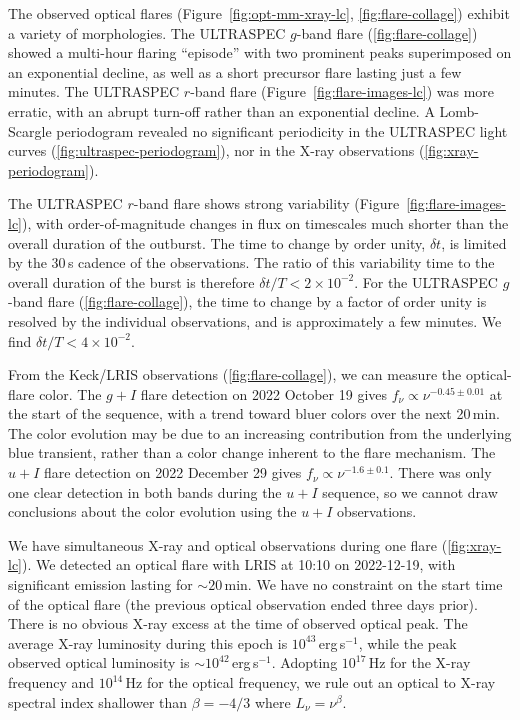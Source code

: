 \documentclass{nature_plusfigure}
\begin{document}
\begin{methods}
The observed optical flares (Figure~\ref{fig:opt-mm-xray-lc}, \ref{fig:flare-collage}) exhibit a variety of morphologies. The ULTRASPEC $g$-band flare (\ref{fig:flare-collage}) showed a multi-hour flaring ``episode'' with two prominent peaks superimposed on an exponential decline, as well as a short precursor flare lasting just a few minutes. The ULTRASPEC $r$-band flare (Figure~\ref{fig:flare-images-lc}) was more erratic, with an abrupt turn-off rather than an exponential decline. A Lomb-Scargle periodogram\cite{Lomb1976,Scargle1982} revealed no significant periodicity in the ULTRASPEC light curves (\ref{fig:ultraspec-periodogram}), nor in the X-ray observations (\ref{fig:xray-periodogram}). %

The ULTRASPEC $r$-band flare shows strong variability (Figure~\ref{fig:flare-images-lc}), with order-of-magnitude changes in flux on timescales much shorter than the overall duration of the outburst. The time to change by order unity, $\delta t$, is limited by the 30\,s cadence of the observations. The ratio of this variability time to the overall duration of the burst is therefore $\delta t/T<2\times10^{-2}$. For the ULTRASPEC $g$-band flare (\ref{fig:flare-collage}), the time to change by a factor of order unity is resolved by the individual observations, and is approximately a few minutes. We find $\delta t/T<4\times10^{-2}$.

From the Keck/LRIS observations (\ref{fig:flare-collage}), we can measure the optical-flare color. The $g+I$ flare detection on 2022 October 19 gives $f_\nu \propto \nu^{-0.45\pm0.01}$ at the start of the sequence, with a trend toward bluer colors over the next 20\,min. The color evolution may be due to an increasing contribution from the underlying blue transient, rather than a color change inherent to the flare mechanism.
The $u+I$ flare detection on 2022 December 29 gives $f_\nu \propto \nu^{-1.6\pm0.1}$. There was only one clear detection in both bands during the $u+I$ sequence, so we cannot draw conclusions about the color evolution using the $u+I$ observations. 

We have simultaneous X-ray and optical observations during one flare (\ref{fig:xray-lc}). We detected an optical flare with LRIS at 10:10 on 2022-12-19, with significant emission lasting for $\sim 20$\,min. We have no constraint on the start time of the optical flare (the previous optical observation ended three days prior). There is no obvious X-ray excess at the time of observed optical peak. The average X-ray luminosity during this epoch is $10^{43}\,$erg\,s$^{-1}$, while the peak observed optical luminosity is $\sim 10^{42}$\,erg\,s$^{-1}$.
Adopting $10^{17}\,$Hz for the X-ray frequency and $10^{14}\,$Hz for the optical frequency, we rule out an optical to X-ray spectral index shallower than $\beta=-4/3$ where $L_\nu = \nu^{\beta}$. 


\end{methods}
\end{document}
